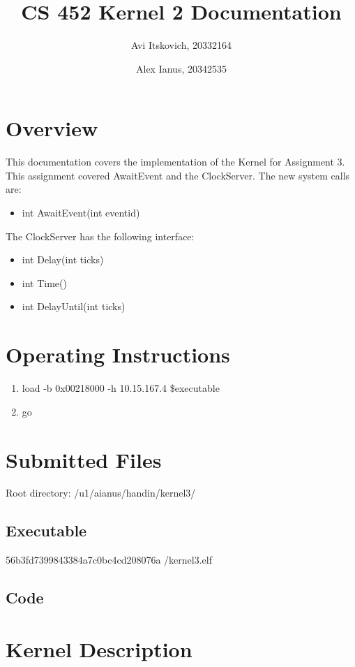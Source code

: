 \documentclass{article}
\title{CS 452 Kernel 2 Documentation}
\author{
  Avi Itskovich, 20332164
  \and
  Alex Ianus, 20342535
}
\begin{document}
\maketitle

\section{Overview}

This documentation covers the implementation of the Kernel for Assignment 3. This assignment covered AwaitEvent and the ClockServer. The new system calls are: 
\begin{itemize}
  \item int AwaitEvent(int eventid)
\end{itemize}
The ClockServer has the following interface:
\begin{itemize}
  \item int Delay(int ticks)
  \item int Time()
  \item int DelayUntil(int ticks)
\end{itemize}

\section{Operating Instructions}
\begin{enumerate}
  \item load -b 0x00218000 -h 10.15.167.4 \$executable
  \item go
\end{enumerate}

\section{Submitted Files}
Root directory: /u1/aianus/handin/kernel3/

\subsection{Executable}
56b3fd7399843384a7c0bc4cd208076a  /kernel3.elf
\subsection{Code}

\section{Kernel Description}
\end{document}
